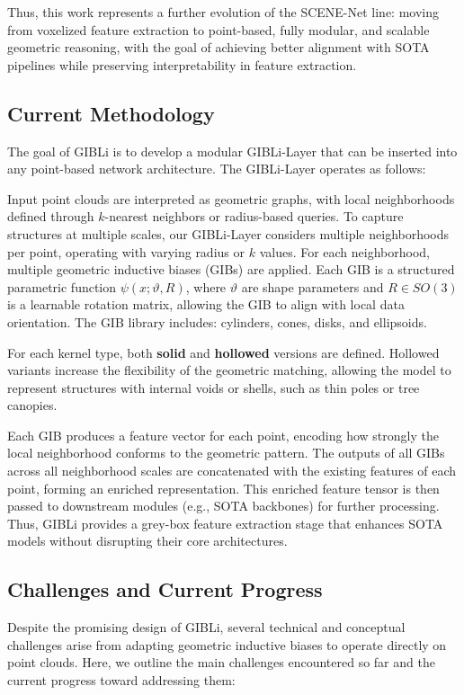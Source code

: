 Thus, this work represents a further evolution of the SCENE-Net line: moving
from voxelized feature extraction to point-based, fully modular, and scalable
geometric reasoning, with the goal of achieving better alignment with SOTA
pipelines while preserving interpretability in feature extraction.

\subsection{Current Methodology}

The goal of GIBLi is to develop a modular GIBLi-Layer that can be inserted into
any point-based network architecture. The GIBLi-Layer operates as follows:

Input point clouds are interpreted as geometric graphs, with local
neighborhoods defined through $k$-nearest neighbors or radius-based queries. To
capture structures at multiple scales, our GIBLi-Layer considers multiple
neighborhoods per point, operating with varying radius or $k$ values.
%
For each neighborhood, multiple geometric inductive biases (GIBs) are applied.
Each GIB is a structured parametric function $\psi(x; \vartheta, R)$, where
$\vartheta$ are shape parameters and $R \in SO(3)$ is a learnable rotation
matrix, allowing the GIB to align with local data orientation.
%
The GIB library includes: cylinders, cones, disks, and ellipsoids.

For each kernel type, both \textbf{solid} and \textbf{hollowed} versions are
defined. Hollowed variants increase the flexibility of the geometric matching,
allowing the model to represent structures with internal voids or shells, such
as thin poles or tree canopies.

Each GIB produces a feature vector for each point, encoding how strongly the
local neighborhood conforms to the geometric pattern. The outputs of all GIBs
across all neighborhood scales are concatenated with the existing features of
each point, forming an enriched representation.
%
This enriched feature tensor is then passed to downstream modules (e.g., SOTA
backbones) for further processing. Thus, GIBLi provides a grey-box feature
extraction stage that enhances SOTA models without disrupting their core
architectures.

\subsection{Challenges and Current Progress}

Despite the promising design of GIBLi, several technical and conceptual
challenges arise from adapting geometric inductive biases to operate directly
on point clouds. Here, we outline the main challenges encountered so far and
the current progress toward addressing them:

